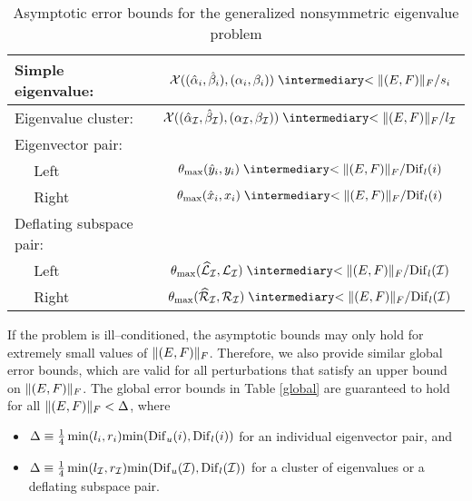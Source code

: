 \begin{table}[h]
\caption{Asymptotic error bounds for the generalized nonsymmetric eigenvalue
problem}\label{asymp}

\begin{center}
\begin{tabular}{|l|c|} \hline
Simple eigenvalue:  &
  ${\cal X}(({\hat{\alpha}}_i,{\hat{\beta}}_i), ({\alpha}_i,{\beta}_i))
    \lapproxeq \normf{(E,F)}/ s_i $ \\ \hline
Eigenvalue cluster: &
  ${\cal X}( ({\hat{\alpha}}_{\cal I},{\hat{\beta}}_{\cal I}),
             ({\alpha}_{\cal I},{\beta}_{\cal I}) )
    \lapproxeq \normf{(E,F)}/ l_{\cal I}$  \\ \hline
Eigenvector pair: &  \\
~~ Left & $\theta_{\max} (\hat{{y}}_i , {y}_i) \lapproxeq
{\normf{(E,F)}}/{{\rm Dif}_l(i)}$\\
~~ Right & $\theta_{\max} (\hat{{x}}_i , {x}_i) \lapproxeq
{\normf{(E,F)}}/{{\rm Dif}_l(i)}$\\ \hline
Deflating subspace pair: & \\
~~ Left & $\theta_{\max} ({\widehat{{\cal L}}}_{\cal I} , {\cal L}_{\cal I})
     \lapproxeq {\normf{(E,F)}}/{{\rm Dif}_l({\cal I})}$ \\
~~ Right & $\theta_{\max} ({\widehat{{\cal R}}}_{\cal I} , {\cal R}_{\cal I})
     \lapproxeq {\normf{(E,F)}}/{{\rm Dif}_l({\cal I})}$ \\ \hline
\end{tabular}
\end{center}
\end{table}

If the problem is ill--conditioned, the asymptotic bounds
may only hold for extremely small values of $\|(E,F)\|_F$. Therefore, we also
provide similar global error bounds, which are valid for
all perturbations that satisfy an upper bound on $\|(E,F)\|_F$.
The global error bounds in Table \ref{global} are guaranteed to hold for all
$\|(E,F)\|_F < {\Delta}$, where
\begin{itemize}
\item ${\Delta} \equiv \frac{1}{4} \min (l_i,r_i)
{\min({\rm Dif}_u(i), {\rm Dif}_l(i))}$ for an individual eigenvector pair, and
\item ${\Delta} \equiv \frac{1}{4} \min (l_{\cal I},r_{\cal I})
{\min({\rm Dif}_u({\cal I}), {\rm Dif}_l({\cal I}))}$ for a cluster of
eigenvalues or a deflating subspace pair.
\end{itemize}

